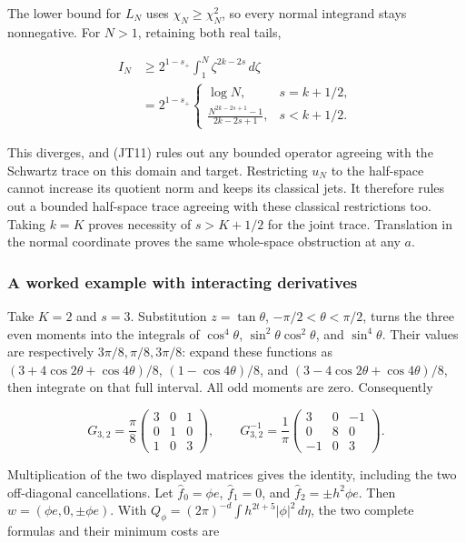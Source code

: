 \documentclass[
  11pt,
]{article}
\begin{document}
The lower bound for \(L_N\) uses \(\chi_N\geq\chi_N^2\), so every normal
integrand stays nonnegative. For \(N>1\), retaining both real tails,

\[
 \begin{aligned}
 I_N&\geq2^{1-s_+}\int_1^N\zeta^{2k-2s}\,d\zeta\\
 &=2^{1-s_+}
 \begin{cases}
 \log N,&s=k+1/2,\\
 \displaystyle\frac{N^{2k-2s+1}-1}{2k-2s+1},&s<k+1/2.
 \end{cases}
 \end{aligned}
 \tag{JT12}
\]

This diverges, and (JT11) rules out any bounded operator agreeing with
the Schwartz trace on this domain and target. Restricting \(u_N\) to the
half-space cannot increase its quotient norm and keeps its classical
jets. It therefore rules out a bounded half-space trace agreeing with
these classical restrictions too. Taking \(k=K\) proves necessity of
\(s>K+1/2\) for the joint trace. Translation in the normal coordinate
proves the same whole-space obstruction at any \(a\).

\subsubsection{A worked example with interacting
derivatives}\label{a-worked-example-with-interacting-derivatives}

Take \(K=2\) and \(s=3\). Substitution \(z=\tan\theta\),
\(-\pi/2<\theta<\pi/2\), turns the three even moments into the integrals
of \(\cos^4\theta\), \(\sin^2\theta\cos^2\theta\), and \(\sin^4\theta\).
Their values are respectively \(3\pi/8,\pi/8,3\pi/8\): expand these
functions as \((3+4\cos2\theta+\cos4\theta)/8\), \((1-\cos4\theta)/8\),
and \((3-4\cos2\theta+\cos4\theta)/8\), then integrate on that full
interval. All odd moments are zero. Consequently

\[
 G_{3,2}=\frac\pi8
   \begin{pmatrix}3&0&1\\0&1&0\\1&0&3\end{pmatrix},\qquad
 G_{3,2}^{-1}=\frac1\pi
   \begin{pmatrix}3&0&-1\\0&8&0\\-1&0&3\end{pmatrix}.
 \tag{JT13}
\]

Multiplication of the two displayed matrices gives the identity,
including the two off-diagonal cancellations. Let
\(\widehat f_0=\phi e\), \(\widehat f_1=0\), and
\(\widehat f_2=\pm h^2\phi e\). Then \(w=(\phi e,0,\pm\phi e)\). With
\(Q_\phi=(2\pi)^{-d}\int h^{2t+5}|\phi|^2\,d\eta\), the two complete
formulas and their minimum costs are
\end{document}
